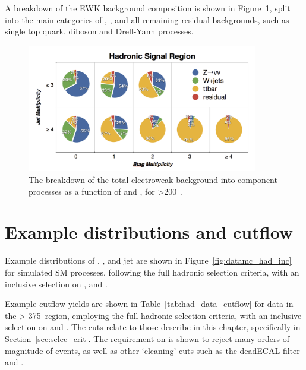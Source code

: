 A breakdown of the EWK background 
composition is shown in Figure~\ref{fig:background_decomp}, split into the main 
categories of \zinv, \wj, \ttbar and all remaining residual backgrounds, such as
single top quark, diboson and Drell-Yann processes.

\begin{figure}[t]
\centering
\hspace{0cm}\includegraphics[width=0.9\textwidth, trim=0 00 0 0, clip=true]
{Figs/ra1_had_bg_comp_v3.png}
\caption{The breakdown of the total electroweak background into component
processes as a function of \nj and \nb, for \HT>200~\gev.}
\label{fig:background_decomp}
\end{figure}

\section{Example distributions and cutflow}

Example distributions of \alphat, \HT, \mht and jet \Pt  are
shown in Figure~\ref{fig:datamc_had_inc} for simulated SM processes,
following the full hadronic selection criteria, with an inclusive selection on \HT,
\nj and \nb.

Example cutflow yields are shown in
Table~\ref{tab:had_data_cutflow} for data in the \HT > 375~\gev region, employing
the full hadronic selection criteria, with an inclusive selection on \nj and \nb.
The cuts relate to those describe in this chapter, specifically in
Section~\ref{sec:selec_crit}. The requirement on \alphat is shown to reject many
orders of magnitude of events, as well as other `cleaning' cuts such as the deadECAL
filter and \mhtmet.

